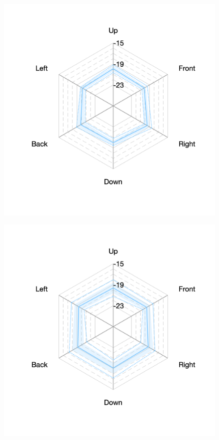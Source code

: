 \documentclass[11pt,a4j]{jreport}
\begin{document}
\begin{figure}[H]
  \begin{minipage}[b]{.33\textwidth}
    \centering
    \includegraphics[width=1\linewidth]{images/realHallDirSt/late_S07_allhall.png}
    \label{fig:S07late}
  \end{minipage}%
  \begin{minipage}[b]{.33\textwidth}
    \centering
    \includegraphics[width=1\linewidth]{images/realHallDirSt/late_S06_allhall.png}

\end{minipage}
\end{figure}
\end{document}
